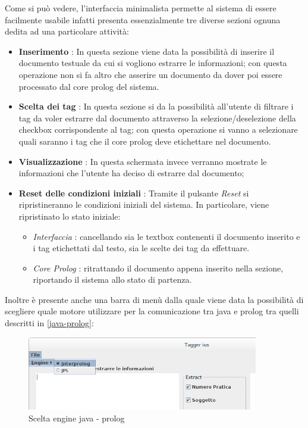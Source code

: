 Come si può vedere, l'interfaccia minimalista permette al sistema di essere facilmente usabile infatti presenta essenzialmente tre diverse sezioni ognuna dedita ad una particolare attività:
    \begin{itemize}
    	\item \textbf{Inserimento} : In questa sezione viene data la possibilità di inserire il documento testuale da cui si vogliono estrarre le informazioni; con questa operazione non si fa altro che asserire un documento da dover poi essere processato dal core prolog del sistema.
    	\item \textbf{Scelta dei tag} : In questa sezione si da la possibilità all'utente di filtrare i tag da voler estrarre dal documento attraverso la selezione/deselezione della checkbox corrispondente al tag; con questa operazione si vanno a selezionare quali saranno i tag che il core prolog deve etichettare nel documento.
    	\item \textbf{Visualizzazione} : In questa schermata invece verranno mostrate le informazioni che l'utente ha deciso di estrarre dal documento;
    	\item \textbf{Reset delle condizioni iniziali} : Tramite il pulsante \emph{Reset} si ripristineranno le condizioni iniziali del sistema. In particolare, viene ripristinato lo stato iniziale:
    	\begin{itemize}
    		\item \emph{Interfaccia} : cancellando sia le textbox contenenti il documento inserito e i tag etichettati dal testo, sia le scelte dei tag da effettuare.
    		\item \emph{Core Prolog} : ritrattando il documento appena inserito nella sezione, riportando il sistema allo stato di partenza.
    	\end{itemize}
    \end{itemize}
Inoltre è presente anche una barra di menù dalla quale viene data la possibilità di scegliere quale motore utilizzare per la comunicazione tra java e prolog tra quelli descritti in \ref{java-prolog}:
\begin{figure}[H]
	\centering
	\includegraphics[width=0.9\textwidth]{img/interfaces/java-engine.png}
	\caption[Schermata java engine]{Scelta engine java - prolog}
	\label{java-engine}
\end{figure}

